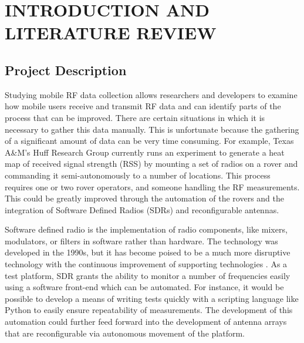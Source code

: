 %
%
%
%


\pagestyle{plain} %

\chapter{INTRODUCTION AND LITERATURE REVIEW}

\section{Project Description}
Studying mobile RF data collection allows researchers and developers to examine
how mobile users receive and transmit RF data and can identify parts of the
process that can be improved. There are certain situations in which it is
necessary to gather this data manually. This is unfortunate because the gathering
of a significant amount of data can be very time consuming. For example, Texas
A\&M's Huff Research Group currently runs an experiment to generate a heat map of
received signal strength (RSS) by mounting a set of radios on a rover and
commanding it semi-autonomously to a number of locations. This process requires
one or two rover operators, and someone handling the RF measurements. This could
be greatly improved through the automation of the rovers and the integration of
Software Defined Radios (SDRs) and reconfigurable antennas. 

Software defined radio is the implementation of radio components, like mixers,
modulators, or filters in software rather than hardware. The technology was
developed in the 1990s, but it has become poised to be a much more disruptive
technology with the continuous improvement of supporting technologies \cite{Emerging_SDR}.
As a test platform, SDR grants the ability to monitor a number of frequencies
easily using a software front-end which can be automated. For instance, it would
be possible to develop a means of writing tests quickly with a scripting language
like Python to easily ensure repeatability of measurements. The development of
this automation could further feed forward into the development of antenna arrays
that are reconfigurable via autonomous movement of the platform. 


